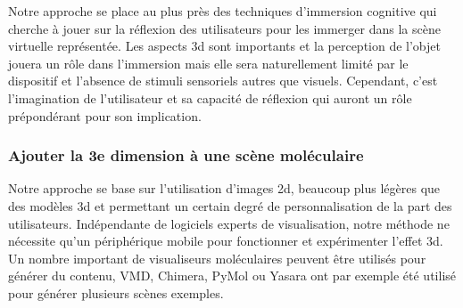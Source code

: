 Notre approche se place au plus près des techniques d'immersion cognitive qui cherche à jouer sur la réflexion des utilisateurs pour les immerger dans la scène virtuelle représentée. Les aspects 3d sont importants et la perception de l'objet jouera un rôle dans l'immersion mais elle sera naturellement limité par le dispositif et l'absence de stimuli sensoriels autres que visuels. Cependant, c'est l'imagination de l'utilisateur et sa capacité de réflexion qui auront un rôle prépondérant pour son implication.

\subsubsection{Ajouter la 3e dimension à une scène moléculaire}

Notre approche se base sur l'utilisation d'images 2d, beaucoup plus légères que des modèles 3d et permettant un certain degré de personnalisation de la part des utilisateurs. Indépendante de logiciels experts de visualisation, notre méthode ne nécessite qu'un périphérique mobile pour fonctionner et expérimenter l'effet 3d. Un nombre important de visualiseurs moléculaires peuvent être utilisés pour générer du contenu, VMD, Chimera, PyMol ou Yasara ont par exemple été utilisé pour générer plusieurs scènes exemples.

